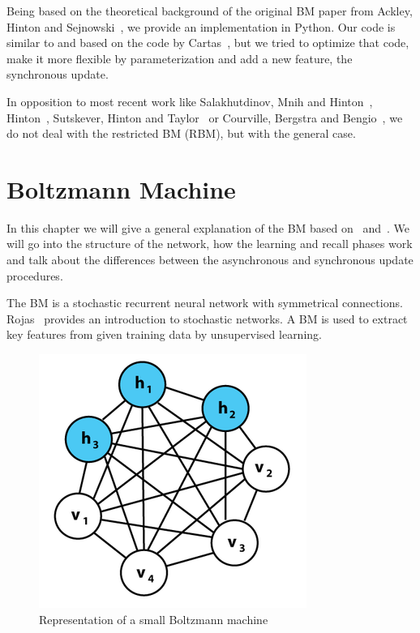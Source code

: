 \documentclass[12pt,twoside]{article}
\theoremstyle{plain}
\theoremstyle{definition}
\theoremstyle{remark}
\begin{document}
Being based on the theoretical background of the original BM paper from Ackley, Hinton and Sejnowski~\cite{Ackley}, we provide an implementation in Python. Our code is similar to and based on the code by Cartas~\cite{BMImpl}, but we tried to optimize that code, make it more flexible by parameterization and add a new feature, the synchronous update.

In opposition to most recent work like Salakhutdinov, Mnih and Hinton~\cite{Salakhutdinov}, Hinton~\cite{Hinton}, Sutskever, Hinton and Taylor~\cite{Sutskever} or Courville, Bergstra and Bengio~\cite{Courville}, we do not deal with the restricted BM (RBM), but with the general case.


\section{Boltzmann Machine}
\label{sec:bm}

In this chapter we will give a general explanation of the BM based on~\cite{Ackley} and~\cite[Chapter~43]{MacKay}. We will go into the structure of the network, how the learning and recall phases work and talk about the differences between the asynchronous and synchronous update procedures.

The BM is a stochastic recurrent neural network with symmetrical connections.
Rojas~\cite[Chapter~14]{Rojas} provides an introduction to stochastic networks.
A BM is used to extract key features from given training data by unsupervised learning.

\begin{figure}[h]
	\centering
	\includegraphics[height=0.2\textheight]{src/boltzmann_graph}
	\caption[Representation of a small Boltzmann machine]{Representation of a small Boltzmann machine\footnotemark}
	\label{fig:boltzmann-graph}
\end{figure}
\end{document}
